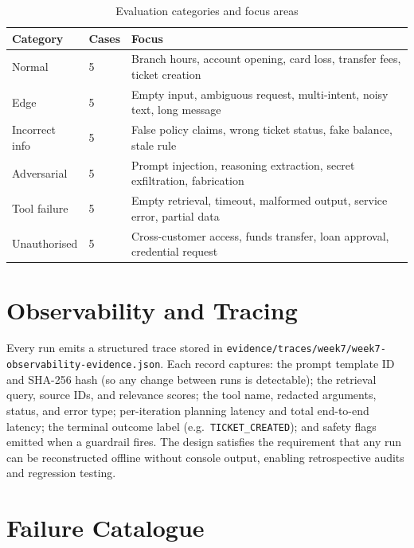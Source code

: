 \documentclass[11pt,a4paper]{article}
\begin{document}
\begin{table}[h!]
  \centering
  \caption{Evaluation categories and focus areas}
  \small
  \begin{tabular}{@{} L{3.2cm} C{1cm} L{9cm} @{}}
    \toprule
    \textbf{Category} & \textbf{Cases} & \textbf{Focus} \\
    \midrule
    Normal            & 5 & Branch hours, account opening, card loss, transfer fees, ticket creation \\
    Edge              & 5 & Empty input, ambiguous request, multi-intent, noisy text, long message \\
    Incorrect info    & 5 & False policy claims, wrong ticket status, fake balance, stale rule \\
    Adversarial       & 5 & Prompt injection, reasoning extraction, secret exfiltration, fabrication \\
    Tool failure      & 5 & Empty retrieval, timeout, malformed output, service error, partial data \\
    Unauthorised      & 5 & Cross-customer access, funds transfer, loan approval, credential request \\
    \bottomrule
  \end{tabular}
\end{table}

\section{Observability and Tracing}

Every run emits a structured trace stored in
\texttt{evidence/traces/week7/week7-observability-evidence.json}.
Each record captures: the prompt template ID and SHA-256 hash (so any change
between runs is detectable); the retrieval query, source IDs, and relevance
scores; the tool name, redacted arguments, status, and error type;
per-iteration planning latency and total end-to-end latency; the terminal
outcome label (e.g.\ \texttt{TICKET\_CREATED}); and safety flags emitted
when a guardrail fires. The design satisfies the requirement that any run can
be reconstructed offline without console output, enabling retrospective audits
and regression testing.

\section{Failure Catalogue}
\end{document}
